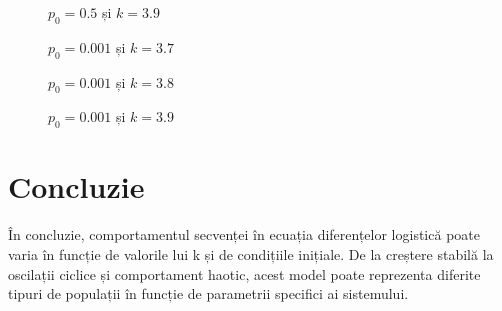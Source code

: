 \documentclass[a4paper,12pt]{article}
\begin{document}
\begin{figure}
\centering
{}
\caption{$p_0 = 0.5$ și $k=3.9$}

\centering
{}
\caption{$p_0 = 0.001$ și $k=3.7$}

\centering
{}
\caption{$p_0 = 0.001$ și $k=3.8$}
\end{figure}

\begin{figure}
\centering
{}
\caption{$p_0 = 0.001$ și $k=3.9$}
\end{figure}


\section{Concluzie}
În concluzie, comportamentul secvenței în ecuația diferențelor logistică poate varia în funcție de valorile lui k și de condițiile inițiale. De la creștere stabilă la oscilații ciclice și comportament haotic, acest model poate reprezenta diferite tipuri de populații în funcție de parametrii specifici ai sistemului.
\end{document}
